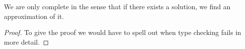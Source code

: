 

\begin{theorem}[Completeness]
    We are only complete in the sense that if there exists a solution, we find
    an approximation of it.
\end{theorem}
\begin{proof}
    To give the proof we would have to spell out when type checking fails in
    more detail.
\end{proof}

